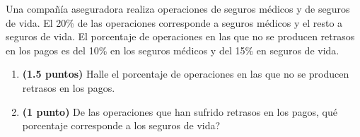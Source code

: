 
Una compañía aseguradora realiza operaciones de seguros médicos y de seguros de vida. El 20\% de las operaciones corresponde a seguros médicos y el resto a seguros de vida. El porcentaje de operaciones en las que no se producen retrasos en los pagos es del 10\% en los seguros médicos y del 15\% en seguros de vida.
\begin{enumerate}[label=\alph*)]
\item \textbf{(1.5 puntos)} Halle el porcentaje de operaciones en las que no se producen retrasos en los pagos.
\item \textbf{(1 punto)} De las operaciones que han sufrido retrasos en los pagos, \textquestiondown{}qué porcentaje corresponde a los seguros de vida?
\end{enumerate}
